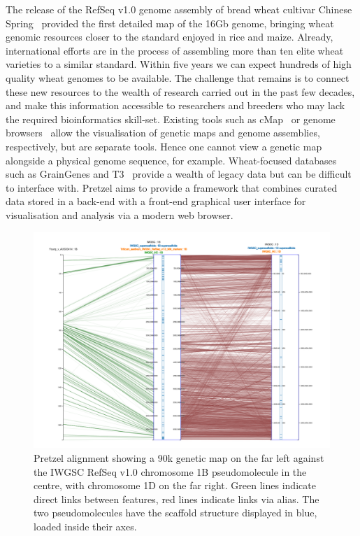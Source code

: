 \documentclass{bioinfo}
\begin{document}
The release of the RefSeq v1.0 genome assembly of bread wheat cultivar Chinese
Spring~\citep{IWGSC2018} provided the first detailed map of the 16Gb genome, bringing wheat genomic
resources closer to the standard enjoyed in rice and maize. 
%
Already, international efforts are in the process of assembling more than ten elite wheat varieties
to a similar standard. 
%
Within five years we can expect hundreds of high quality wheat genomes to be available. 
%
The challenge that remains is to connect these new resources to the wealth of research carried out
in the past few decades, and make this information accessible to researchers and breeders who may
lack the required bioinformatics skill-set.
%
Existing tools such as cMap~\citep{fang2003cmap} or genome
browsers~\citep{Stein2013GBrowse,Buels2016JBrowse} allow the visualisation of genetic maps and genome
assemblies, respectively, but are separate tools. Hence one cannot view a genetic map alongside a
physical genome sequence, for example. 
%
Wheat-focused databases such as GrainGenes and T3~\citep{Blake2016T3} provide a wealth of legacy
data but can be difficult to interface with. 
%
Pretzel aims to provide a framework that combines curated data stored in a back-end with a
front-end graphical user interface for visualisation and analysis via a modern web browser. 
%
\begin{figure}
\centering
  \includegraphics[width=\textwidth]{pretzel.png}
\caption{
  Pretzel alignment showing a 90k genetic map on the far left against the IWGSC RefSeq v1.0 chromosome 1B pseudomolecule in the centre, 
  with chromosome 1D on the far right. 
  Green lines indicate direct links between features, red lines indicate links via alias. 
  The two pseudomolecules have the scaffold structure displayed in blue, loaded inside their axes.
}
\label{fig:01}
\end{figure}
\end{document}
